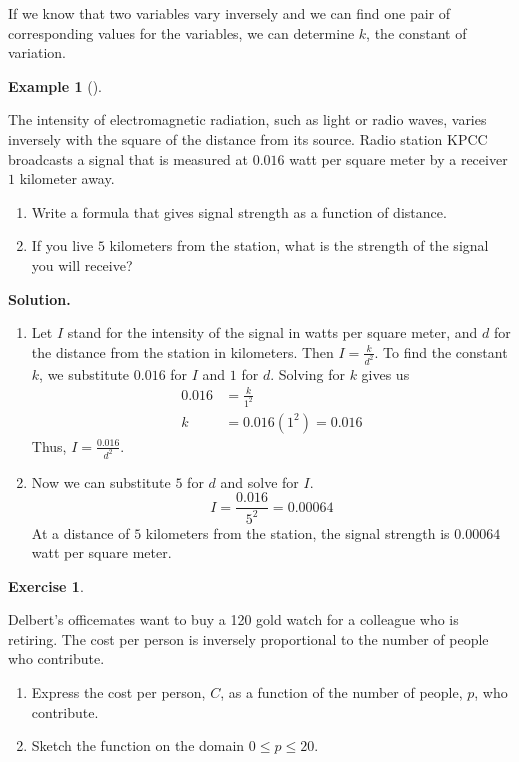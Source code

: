 \documentclass[10pt,]{book}
\theoremstyle{plain}
\theoremstyle{definition}
\theoremstyle{definition}
\theoremstyle{definition}
\newtheorem{example}[theorem]{Example}
\theoremstyle{definition}
\theoremstyle{definition}
\newtheorem{exercise}[theorem]{Exercise}
\numberwithin{equation}{section}
\newcommand{\amp}{ & }
\begin{document}
	If we know that two variables vary inversely and we can find one pair of corresponding values for the variables, we can determine \(k\), the constant of variation.
%
\begin{example}[]\label{example-EMR-vs-distance}

	The intensity of electromagnetic radiation, such as light or radio waves, varies inversely with the square of the distance from its source. Radio station KPCC broadcasts a signal that is measured at \(0.016\) watt per square meter by a receiver \(1\) kilometer away.
	\leavevmode%
\begin{enumerate}[label=*\alph**]
\item\hypertarget{li-410}{}Write a formula that gives signal strength as a function of distance.\item\hypertarget{li-411}{}If you live \(5\) kilometers from the station, what is the strength of the signal you will receive?\end{enumerate}

%
\par\medskip\noindent%
\textbf{Solution.}\quad \leavevmode%
\begin{enumerate}[label=*\alph**]
\item\hypertarget{li-412}{}
		Let \(I\) stand for the intensity of the signal in watts per square meter, and \(d\) for the distance from the station in kilometers. Then \(I = \frac{k}{d^2}\). To find the constant \(k\), we substitute \(0.016\) for \(I\) and \(1\) for \(d\). Solving for \(k\) gives us
		\begin{align*}
			0.016 \amp = \frac{k}{1^2} \\
			k \amp = 0.016 (1^2) = 0.016
		\end{align*}
		Thus, \(I = \frac{0.016}{d^2}\).
	\item\hypertarget{li-413}{}
		Now we can substitute \(5\) for \(d\) and solve for \(I\).
		\begin{equation*}I = \frac{0.016}{5^2}= 0.00064\end{equation*}
		At a distance of \(5\) kilometers from the station, the signal strength is \(0.00064\) watt per square meter.
	\end{enumerate}
\end{example}
\begin{exercise}\label{exercise-share-gift}

	Delbert’s officemates want to buy a \textdollar{}120 gold watch for a colleague who is retiring. The cost per person is inversely proportional to the number of people who contribute.
	\leavevmode%
\begin{enumerate}[label=*\alph**]
\item\hypertarget{li-414}{}Express the cost per person, \(C\), as a function of the number of people, \(p\), who contribute.\item\hypertarget{li-415}{}Sketch the function on the domain \(0 \le p \le 20\).\end{enumerate}

%
\end{exercise}
\typeout{************************************************}
\typeout{************************************************}
\end{document}
